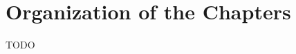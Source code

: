 \section{Organization of the Chapters}\label{sec:intro:org}
TODO

\begin{comment}
In my dissertation, I will contribute to answering the question
``how does one build a seamless system where programmers
can both write (functional) programs
and formally reason about those programs.''
I will introduce the motivation for pursuing such a system
in \S\ref{sec:motiv},
and I will also discuss foundational work upon which
the approach developed in my thesis is based.


\section{Motivation} \label{sec:motiv}

\section{Thesis}
In my dissertation, I will contribute to answering the question
``how does one build a seamless system where programmers
can both write (functional) programs
and formally reason about those programs.'' In Chapter \ref{ch:relwork},
I will introduce the motivation for pursuing such a system.
I will discuss other approaches to building such a system,
and I will also discuss foundational work upon which
the approach developed in my thesis is based.
The following is my thesis statement, which summarizes my
approach:
\begin{quote}
A language equipped with \emph{term indexed types} and
\emph{Mendler-style recursion combinators} can be 
(1) a basis for \emph{sound and consistent logic}
suitable for reasoning about properties of (functional) programs
and also
(2) a basis for a \emph{simple and expressive programming language}
suitable for writing the (functional) programs to be reasoned about.
\end{quote}

I believe such an approach is promising because, under the design I will
promote, both the logic and the programming language share many
common features. Amongst those features are the two design concepts
of indexed types and Mendler-style recursion combinators.

\emph{Term indexed types} are types indexed by terms. The concept of
term indexed types can be informally understood by contrasting the traditional
(non-indexed) polymorphic list type (\textsf{List} $a$) and a length indexed
(and also polymorphic) list type (\textsf{Vec} $a$ $n$). The polymorphic list
type (\textsf{List} $a$) is parametrized by a type variable ($a:*$), which can
be instantiated to any type. Example instantiations include \textsf{List Nat},
\textsf{List Bool}, and \textsf{List} (\textsf{List Nat}).


\end{comment}
